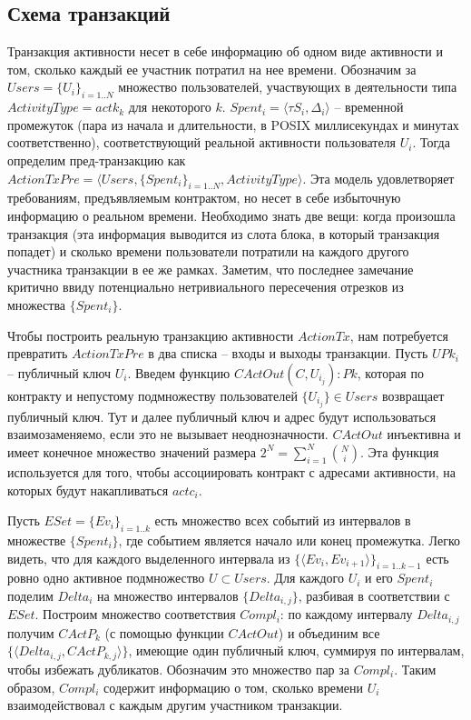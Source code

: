 \documentclass[specification,annotation]{itmo-student-thesis}
\begin{document}
\subsection{Схема транзакций}

Транзакция активности несет в себе информацию об одном виде активности
и том, сколько каждый ее участник потратил на нее времени. Обозначим
за $Users = \{U_i\}_{i=1..N}$ множество пользователей, участвующих в
деятельности типа $ActivityType = actk_k$ для некоторого $k$. $Spent_i
= \langle \tau S_i, \Delta_i \rangle$ -- временной промежуток (пара из
начала и длительности, в POSIX миллисекундах и минутах
соответственно), соответствующий реальной активности пользователя
$U_i$. Тогда определим пред-транзакцию как $ActionTxPre = \langle
Users, \{Spent_i\}_{i=1..N}, ActivityType \rangle$. Эта модель
удовлетворяет требованиям, предъявляемым контрактом, но несет в себе
избыточную информацию о реальном времени. Необходимо знать две вещи:
когда произошла транзакция (эта информация выводится из слота блока, в
который транзакция попадет) и сколько времени пользователи потратили
на каждого другого участника транзакции в ее же рамках. Заметим, что
последнее замечание критично ввиду потенциально нетривиального
пересечения отрезков из множества $\{Spent_i\}$.

Чтобы построить реальную транзакцию активности $ActionTx$, нам
потребуется превратить $ActionTxPre$ в два списка -- входы и выходы
транзакции. Пусть $UPk_i$ -- публичный ключ $U_i$. Введем функцию
$CActOut(C, {U_{i_j}}) : Pk$, которая по контракту и непустому
подмножеству пользователей $\{U_{i_j}\} \in Users$ возвращает
публичный ключ. Тут и далее публичный ключ и адрес будут
использоваться взаимозаменяемо, если это не вызывает
неоднозначности. $CActOut$ инъективна и имеет конечное множество
значений размера $2^N = \sum_{i=1}^N{\binom{N}{i}}$. Эта функция
используется для того, чтобы ассоциировать контракт с адресами
активности, на которых будут накапливаться $actc_i$.

Пусть $ESet = \{Ev_i\}_{i=1..k}$ есть множество всех событий из
интервалов в множестве $\{Spent_i\}$, где событием является начало или
конец промежутка. Легко видеть, что для каждого выделенного интервала
из $\{\langle Ev_i, Ev_{i+1} \rangle\}_{i=1..k-1}$ есть ровно одно
активное подмножество $U \subset Users$. Для каждого $U_i$ и его
$Spent_i$ поделим $Delta_i$ на множество интервалов $\{Delta_{i,j}\}$,
разбивая в соответствии с $ESet$. Построим множество соответствия
$Compl_i$: по каждому интервалу $Delta_{i,j}$ получим $CActP_k$ (с
помощью функции $CActOut$) и объединим все $\{\langle Delta_{i,j},
CActP_{k,j}\rangle\}$, имеющие один публичный ключ, суммируя по
интервалам, чтобы избежать дубликатов. Обозначим это множество пар за
$Compl_i$. Таким образом, $Compl_i$ содержит информацию о том, сколько
времени $U_i$ взаимодействовал с каждым другим участником транзакции.
\end{document}
